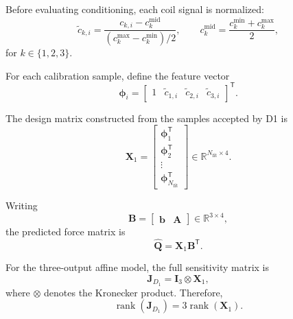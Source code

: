 \documentclass[11pt,a4paper]{article}
\begin{document}
Before evaluating conditioning, each coil signal is normalized:
\begin{equation}
    \widetilde{c}_{k,i}
    =
    \frac{
        c_{k,i}-c_k^{\mathrm{mid}}
    }{
        \left(c_k^{\max}-c_k^{\min}\right)/2
    },
    \qquad
    c_k^{\mathrm{mid}}
    =
    \frac{c_k^{\min}+c_k^{\max}}{2},
\end{equation}
for $k\in\{1,2,3\}$.

For each calibration sample, define the feature vector
\begin{equation}
    \boldsymbol{\phi}_i
    =
    \begin{bmatrix}
        1 &
        \widetilde{c}_{1,i} &
        \widetilde{c}_{2,i} &
        \widetilde{c}_{3,i}
    \end{bmatrix}^{\mathsf{T}}.
\end{equation}

The design matrix constructed from the samples accepted by D1 is
\begin{equation}
    \mathbf{X}_1
    =
    \begin{bmatrix}
        \boldsymbol{\phi}_1^{\mathsf{T}}\\
        \boldsymbol{\phi}_2^{\mathsf{T}}\\
        \vdots\\
        \boldsymbol{\phi}_{N_{\mathrm{fit}}}^{\mathsf{T}}
    \end{bmatrix}
    \in
    \mathbb{R}^{N_{\mathrm{fit}}\times4}.
\end{equation}

Writing
\begin{equation}
    \mathbf{B}
    =
    \begin{bmatrix}
        \mathbf{b} & \mathbf{A}
    \end{bmatrix}
    \in\mathbb{R}^{3\times4},
\end{equation}
the predicted force matrix is
\begin{equation}
    \widehat{\mathbf{Q}}
    =
    \mathbf{X}_1\mathbf{B}^{\mathsf{T}}.
\end{equation}

For the three-output affine model, the full sensitivity matrix is
\begin{equation}
    \mathbf{J}_{D_1}
    =
    \mathbf{I}_3\otimes\mathbf{X}_1,
\end{equation}
where $\otimes$ denotes the Kronecker product. Therefore,
\begin{equation}
    \operatorname{rank}(\mathbf{J}_{D_1})
    =
    3\operatorname{rank}(\mathbf{X}_1).
\end{equation}
\end{document}
